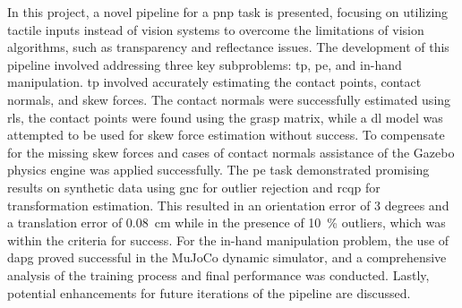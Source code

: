 \setlength{\parindent}{0pt}
\normalsize



In this project, a novel pipeline for a \gls{pnp} task is presented, focusing on utilizing tactile inputs instead of vision systems to overcome the limitations of vision algorithms, such as transparency and reflectance issues. The development of this pipeline involved addressing three key subproblems: \gls{tp}, \gls{pe}, and in-hand manipulation. \gls{tp} involved accurately estimating the contact points, contact normals, and skew forces. The contact normals were successfully estimated using \gls{rls}, the contact points were found using the grasp matrix, while a \gls{dl} model was attempted to be used for skew force estimation without success. To compensate for the missing skew forces and cases of contact normals assistance of the Gazebo physics engine was applied successfully. The \gls{pe} task demonstrated promising results on synthetic data using \gls{gnc} for outlier rejection and \gls{rcqp} for transformation estimation. This resulted in an orientation error of \num{3} degrees and a translation error of  \SI{0.08}{\centi\meter} while in the presence of \SI{10}{\percent} outliers, which was within the criteria for success. For the in-hand manipulation problem, the use of \gls{dapg} proved successful in the MuJoCo dynamic simulator, and a comprehensive analysis of the training process and final performance was conducted. Lastly, potential enhancements for future iterations of the pipeline are discussed.


